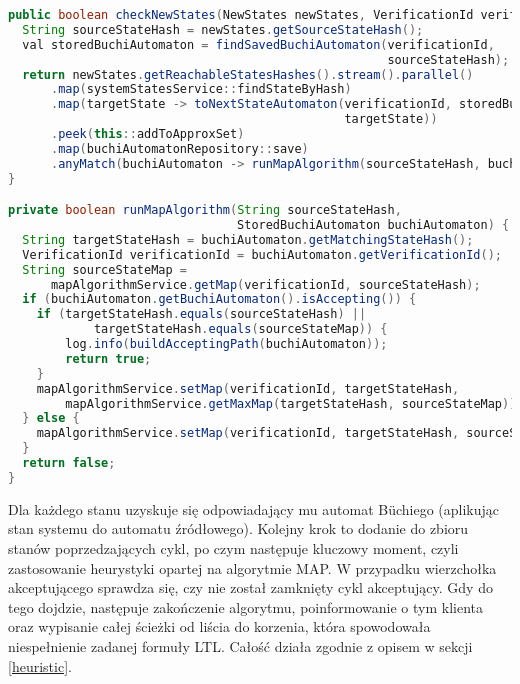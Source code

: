 \begin{minipage}{\linewidth}
\begin{lstlisting}[caption={Implementacja heurystyki pozwalającej na weryfikację modelową w locie.},captionpos=b,label={lst:checkNewStates},language=Java]
public boolean checkNewStates(NewStates newStates, VerificationId verificationId) {
  String sourceStateHash = newStates.getSourceStateHash();
  val storedBuchiAutomaton = findSavedBuchiAutomaton(verificationId,
                                                     sourceStateHash);
  return newStates.getReachableStatesHashes().stream().parallel()
      .map(systemStatesService::findStateByHash)
      .map(targetState -> toNextStateAutomaton(verificationId, storedBuchiAutomaton,
                                               targetState))
      .peek(this::addToApproxSet)
      .map(buchiAutomatonRepository::save)
      .anyMatch(buchiAutomaton -> runMapAlgorithm(sourceStateHash, buchiAutomaton));
}

private boolean runMapAlgorithm(String sourceStateHash,
                                StoredBuchiAutomaton buchiAutomaton) {
  String targetStateHash = buchiAutomaton.getMatchingStateHash();
  VerificationId verificationId = buchiAutomaton.getVerificationId();
  String sourceStateMap =
      mapAlgorithmService.getMap(verificationId, sourceStateHash);
  if (buchiAutomaton.getBuchiAutomaton().isAccepting()) {
    if (targetStateHash.equals(sourceStateHash) ||
            targetStateHash.equals(sourceStateMap)) {
        log.info(buildAcceptingPath(buchiAutomaton));
        return true;
    }
    mapAlgorithmService.setMap(verificationId, targetStateHash,
        mapAlgorithmService.getMaxMap(targetStateHash, sourceStateMap));
  } else {
    mapAlgorithmService.setMap(verificationId, targetStateHash, sourceStateMap);
  }
  return false;
}

\end{lstlisting}
\end{minipage}

Dla każdego stanu uzyskuje się odpowiadający mu automat Büchiego (aplikując stan systemu do automatu źródłowego).
Kolejny krok to dodanie do zbioru stanów poprzedzających cykl, po czym następuje kluczowy moment, czyli zastosowanie heurystyki opartej na algorytmie MAP.
W przypadku wierzchołka akceptującego sprawdza się, czy nie został zamknięty cykl akceptujący.
Gdy do tego dojdzie, następuje zakończenie algorytmu, poinformowanie o tym klienta oraz wypisanie całej ścieżki od liścia do korzenia, która spowodowała niespełnienie zadanej formuły LTL. Całość działa zgodnie z opisem w sekcji \ref{heuristic}.

